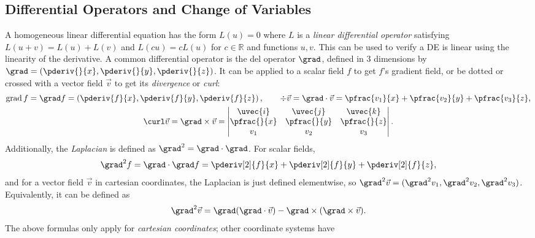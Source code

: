 \documentclass[10pt, a4paper]{article}
\begin{document}
\begin{landscape}

\begin{multicols*}{2}
    \section{Differential Operators and Change of Variables}

    A homogeneous linear differential equation has the form \(L(u) = 0\) where \(L\) is a
    \emph{linear differential operator} satisfying \(L(u+v) = L(u) + L(v)\) and
    \(L(cu) = c L(u)\) for \(c \in \mathbb{R}\) and functions \(u, v\). This can be used
    to verify a DE is linear using the linearity of the derivative. A common differential operator
    is the del operator \(\grad\), defined in 3 dimensions by
    \(\grad = (\pderiv{}{x}, \pderiv{}{y}, \pderiv{}{z})\). It can be applied to a scalar field
    \(f\) to get \(f\)'s gradient field, or be dotted or crossed with a vector field \(\vec{v}\)
    to get its \emph{divergence} or \emph{curl}:
    \begin{gather*}
        \operatorname{grad} f = \grad f = \left(\pderiv{f}{x}, \pderiv{f}{y}, \pderiv{f}{z}\right),
        \qquad
        \div \vec{v} = \grad \cdot \vec{v} = \pfrac{v_1}{x} + \pfrac{v_2}{y} + \pfrac{v_3}{z}, \\
        \curl \vec{v} = \grad \times \vec{v} = 
        \begin{vmatrix}
            \uvec{i} & \uvec{j} & \uvec{k} \\
            \pfrac{}{x} & \pfrac{}{y} & \pfrac{}{z} \\
            v_1 & v_2 & v_3
        \end{vmatrix}.
    \end{gather*}
    Additionally, the \emph{Laplacian} is defined as \(\grad^2 = \grad \cdot \grad\). For scalar fields,
    \[
        \grad^2 f = \grad \cdot \grad f = \pderiv[2]{f}{x} + \pderiv[2]{f}{y} + \pderiv[2]{f}{z},
    \]
    and for a vector field \(\vec{v}\) in cartesian coordinates, the Laplacian is just defined
    elementwise, so \(\grad^2 \vec{v} = (\grad^2 v_1, \grad^2 v_2, \grad^2 v_3)\).
    Equivalently, it can be defined as
    \[
        \grad^2 \vec{v} = \grad(\grad \cdot \vec{v}) - \grad \times (\grad \times \vec{v}).
    \]
    The above formulas only apply for \emph{cartesian coordinates}; other coordinate systems have

\end{multicols*}
\end{landscape}
\end{document}
